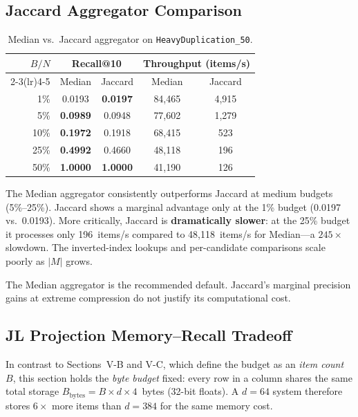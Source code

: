 \documentclass[conference]{IEEEtran}
\begin{document}
\subsection{Jaccard Aggregator Comparison}

\begin{table}[h]
\centering
\caption{Median vs.\ Jaccard aggregator on \texttt{HeavyDuplication\_50}.}
\label{tab:jaccard}
\begin{tabular}{@{}rcccc@{}}
\toprule
$B/N$ & \multicolumn{2}{c}{Recall@10} & \multicolumn{2}{c}{Throughput (items/s)} \\
\cmidrule(lr){2-3}\cmidrule(lr){4-5}
      & Median & Jaccard & Median & Jaccard \\
\midrule
 1\% & 0.0193 & \textbf{0.0197} &  84,465 & 4,915 \\
 5\% & \textbf{0.0989} & 0.0948 &  77,602 & 1,279 \\
10\% & \textbf{0.1972} & 0.1918 &  68,415 &   523 \\
25\% & \textbf{0.4992} & 0.4660 &  48,118 &   196 \\
50\% & \textbf{1.0000} & \textbf{1.0000} &  41,190 &   126 \\
\bottomrule
\end{tabular}
\end{table}

The Median aggregator consistently outperforms Jaccard at medium budgets
(5\%--25\%). Jaccard shows a marginal advantage only at the 1\% budget
(0.0197 vs.\ 0.0193). More critically, Jaccard is \textbf{dramatically
slower}: at the 25\% budget it processes only 196~items/s compared to
48,118~items/s for Median---a $245\times$ slowdown. The inverted-index
lookups and per-candidate comparisons scale poorly as $|M|$ grows.

The Median aggregator is the recommended default. Jaccard's marginal
precision gains at extreme compression do not justify its computational
cost.

\subsection{JL Projection Memory--Recall Tradeoff}

In contrast to Sections~V-B and V-C, which define the budget as an
\emph{item count} $B$, this section holds the \emph{byte budget} fixed:
every row in a column shares the same total storage
$B_{\text{bytes}} = B \times d \times 4$~bytes (32-bit floats). A
$d{=}64$ system therefore stores $6\times$ more items than $d{=}384$
for the same memory cost.
\end{document}
